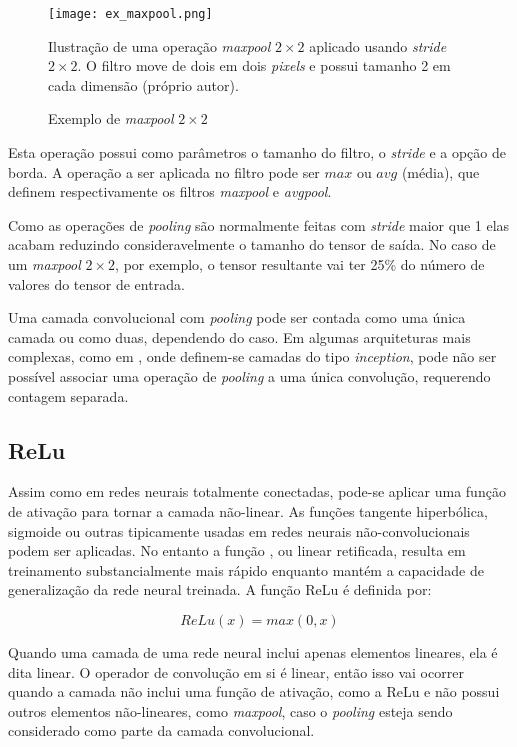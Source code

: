 \begin{figure}[!htb]
	\centering
	\texttt{[image: ex\_maxpool.png]}
	\caption{Exemplo de \emph{maxpool} $2 \times 2$}
	\label{fig:ex_maxpool}
	Ilustração de uma operação \emph{maxpool} $2 \times 2$ aplicado usando
	\emph{stride} $2 \times 2$. O filtro move de dois em dois \emph{pixels}
	e possui tamanho 2 em cada dimensão (próprio autor).
\end{figure}

Esta operação possui como parâmetros o tamanho do filtro, o \emph{stride} e
a opção de
borda. A operação a ser aplicada no filtro pode ser $max$ ou $avg$ (média),
que definem respectivamente os filtros \emph{maxpool} e \emph{avgpool}.

Como as operações de \emph{pooling} são normalmente feitas com \emph{stride}
maior que 1 elas
acabam reduzindo consideravelmente o tamanho do tensor de saída. No caso de um
\emph{maxpool} $2 \times 2$, por exemplo, o tensor resultante vai ter 25\% do
número de valores do tensor de entrada.

Uma camada convolucional com \emph{pooling} pode ser contada como uma única
camada ou
como duas, dependendo do caso. Em algumas arquiteturas mais complexas, como em
\cite{szegedy2015going}, onde definem-se camadas do tipo \emph{inception},
pode não ser possível associar uma operação de \emph{pooling} a uma única
convolução, requerendo contagem separada.

\subsection{ReLu}
Assim como em redes neurais totalmente conectadas, pode-se aplicar uma função
de ativação para tornar a camada não-linear. As funções tangente
hiperbólica, sigmoide ou outras tipicamente usadas em redes neurais
não-convolucionais podem ser aplicadas. No entanto a função
, ou
linear retificada, resulta em treinamento substancialmente mais rápido enquanto
mantém a capacidade de generalização da rede neural treinada. A função
ReLu é definida por:


\begin{equation}
	ReLu(x) = max(0,x)
\end{equation}

Quando uma camada de uma rede neural inclui apenas elementos lineares,
ela é dita linear. O operador de convolução em si é linear, então
isso vai ocorrer quando a camada não inclui uma função de ativação, como
a ReLu e não possui outros elementos não-lineares, como \emph{maxpool},
caso o \emph{pooling} esteja sendo considerado como parte da camada
convolucional.

